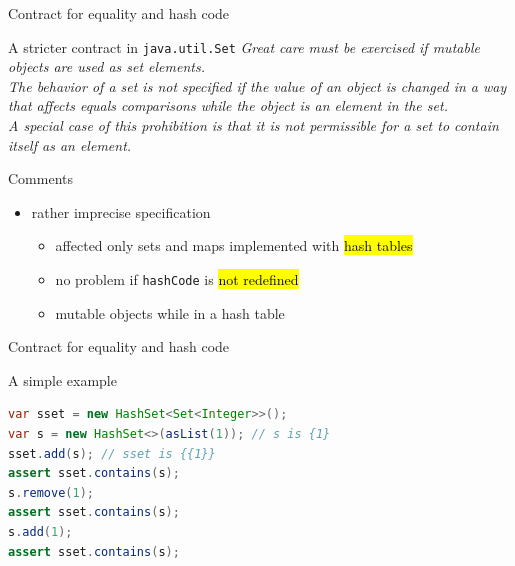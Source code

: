 \documentclass[10pt,usenames,dvipsnames]{beamer}
\begin{document}

\begin{frame}{Contract for equality and hash code}
  \begin{block}{A stricter contract in \lstinline[basicstyle=\ttfamily\large]{java.util.Set}}
    \emph{Great care must be exercised if mutable objects are used as set elements.}\\[1ex]
    \emph{The behavior of a set is not specified if the value of an object is changed in a way that affects equals comparisons while the object is an element in the set.} \\[1ex]
    \emph{A special case of this prohibition is that it is not permissible for a set to contain itself as an element.} 
  \end{block}

  \begin{block}{Comments}
    \begin{itemize}
    \item rather imprecise specification
      \begin{itemize}
      \item affected only sets and maps implemented with \hl{hash tables}
      \item no problem if \lstinline[basicstyle=\ttfamily\normalsize]{hashCode} is \hl{not redefined}
      \item mutable objects   while in a hash table
      \end{itemize}
\end{itemize}
  \end{block}
  
\end{frame}


\begin{frame}[fragile]{Contract for equality and hash code}
  \begin{block}{A simple example}
    \begin{lstlisting}[language=Java,basicstyle=\ttfamily\scriptsize]
var sset = new HashSet<Set<Integer>>();
var s = new HashSet<>(asList(1)); // s is {1}
sset.add(s); // sset is {{1}}
assert sset.contains(s); 
s.remove(1);
assert sset.contains(s); 
s.add(1);
assert sset.contains(s); 
    \end{lstlisting}
  \end{block}
\end{frame}
\end{document}
